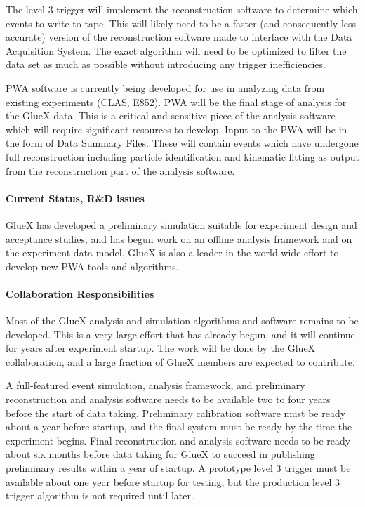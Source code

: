 \documentclass[11pt]{article}
\begin{document}
The level 3 trigger will
implement the reconstruction software to determine
which events to write to tape. This will likely 
need to be a faster (and consequently less accurate) version
of the reconstruction software made to interface with the Data Acquisition
System. The exact algorithm will need to be optimized to filter the data set
as much as possible without introducing any trigger
inefficiencies.


PWA software is currently being
developed for use in analyzing data from existing experiments
(CLAS, E852). PWA will be the final stage of analysis for
the GlueX data. This is a critical and sensitive piece of the
analysis software which will require significant resources
to develop. Input to the PWA
will be in the form of Data Summary Files. These will contain
events which have undergone full reconstruction including
particle identification and kinematic fitting as output
from the reconstruction part of the analysis software.


\paragraph{Current Status, R\&D issues}


GlueX has developed a preliminary simulation suitable for experiment design
and acceptance studies, and has begun work on an offline analysis
framework and on the experiment data model.  GlueX is also a leader in
the world-wide effort to develop new PWA tools and algorithms.  



\paragraph{Collaboration Responsibilities}


Most of the GlueX analysis and simulation algorithms and software
remains to be developed.  This is a very large effort that has already
begun, and it will continue for years after experiment startup.  The
work will be done by the GlueX collaboration, and a large fraction of
GlueX members are expected to contribute.


A full-featured event simulation, analysis framework, and preliminary
reconstruction and analysis software needs to be available two to four
years before the start of data taking. Preliminary calibration software
must be ready about a year before
startup, and the final system must be ready by the time the experiment
begins. Final reconstruction and
analysis software needs to be ready about six months before data
taking for GlueX to succeed in publishing preliminary results within a
year of startup. A prototype level 3 trigger must be available
about one year before startup for testing, but the production level 3
trigger algorithm is not required until later.
\end{document}

